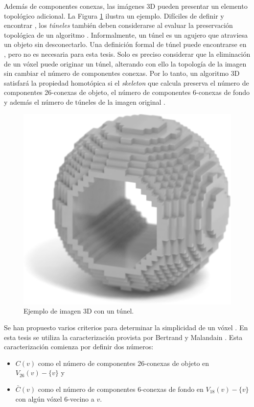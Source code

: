 Además de componentes conexas, las imágenes 3D pueden presentar un elemento topológico adicional. La Figura \ref{fig:tunnelexample} ilustra un ejemplo. Difíciles de definir y encontrar \cite{svensson2003finding}, los  \textit{túneles} también deben considerarse al evaluar la preservación topológica de un algoritmo \cite{cornea2007curve}. Informalmente, un túnel es un agujero que atraviesa un objeto sin desconectarlo. Una definición formal de túnel puede encontrarse en \cite{kong1989digital2}, pero no es necesaria para esta tesis. Solo es preciso considerar que la eliminación de un vóxel puede originar un túnel, alterando con ello la topología de la imagen sin cambiar el número de componentes conexas. Por lo tanto, un algoritmo 3D satisfará la propiedad homotópica si el \textit{skeleton} que calcula preserva el número de componentes 26-conexas de objeto, el número de componentes 6-conexas de fondo y además el número de túneles de la imagen original \cite{Lieutier20041029}.

\begin{figure}[ht]\centering
\includegraphics[width=0.4\linewidth]{images/tunnelexample}
\caption{Ejemplo de imagen 3D con un túnel.}
\label{fig:tunnelexample}
\end{figure}

Se han propuesto varios criterios para determinar la simplicidad de un vóxel \cite{kong1989digital2, tsao1981parallel, university1981three}. En esta tesis se utiliza la caracterización provista por Bertrand y Malandain \cite{bertrand1994new}. Esta caracterización comienza por definir dos números:

\begin{itemize}
\item $C(v)$ como el número de componentes 26-conexas de objeto en $V_{26}(v) - \{v\}$ y
\item $\bar{C}(v)$ como el número de componentes 6-conexas de fondo en $V_{18}(v) - \{v\}$ con algún vóxel 6-vecino a $v$.
\end{itemize}

